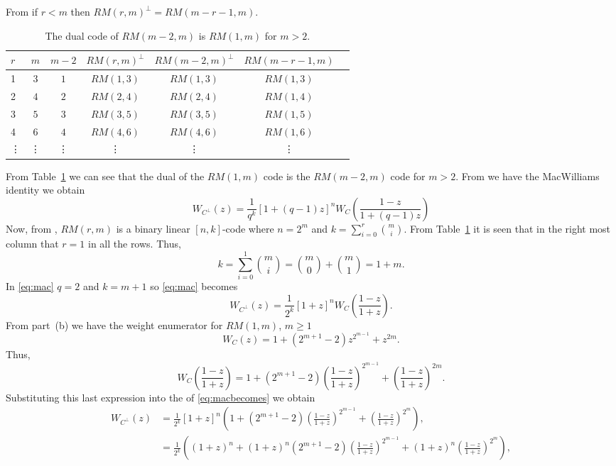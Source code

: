 From  if $r<m$ then $RM(r,m)^\perp = RM(m-r-1,m)$.

\begin{table}[h!]
\centering
\begin{tabular}{@{}lcccc|cl@{}}
\toprule
$r$&$m$ & $m-2$ & $RM(r,m)^\perp$ & $RM(m-2,m)^\perp$ &$RM(m-r-1,m)$ &  \\ \midrule
1 & $3$ & $1$ & $RM(1,3)$ & $RM(1,3)$  &$RM(1,3)$&  \\
2 & $4$ & $2$ & $RM(2,4)$ & $RM(2,4)$  &$RM(1,4)$&  \\ 
3 & $5$ & $3$ & $RM(3,5)$ & $RM(3,5)$  &$RM(1,5)$&  \\ 
4 & $6$ & $4$ & $RM(4,6)$ & $RM(4,6)$  &$RM(1,6)$&  \\ 
\vdots &\vdots& \vdots & \vdots &\vdots &\vdots &  \\ 
 \bottomrule
\end{tabular}
\caption{The dual code of $RM(m-2,m)$ is $RM(1,m)$ for $m>2$.}
\label{tab:rmduals}
\end{table}
From Table~\ref{tab:rmduals} we can see that the dual of the  $RM(1,m)$ code is the $RM(m-2,m)$ code for $m>2$. From  we have the MacWilliams identity we obtain
\begin{equation}
\label{eq:mac}
W_{C^\perp}(z) = \frac{1}{q^{k}}\left[1+(q-1)z\right]^n W_{C}\left(\frac{1-z}{1+(q-1)z}\right)
\end{equation}
Now, from , $RM(r,m)$ is a binary linear $[n,k]$-code where $n=2^m$ and $k=\sum_{i=0}^r\binom{m}{i}$. From Table~\ref{tab:rmduals} it is seen that in the right most column that $r=1$ in all the rows. Thus,
\[
	k = \sum_{i=0}^1\binom{m}{i} = \binom{m}{0} + \binom{m}{1} = 1 + m.
\]
In \ref{eq:mac} $q=2$ and $k=m+1$ so \ref{eq:mac} becomes
\begin{equation}
\label{eq:macbecomes}
W_{C^\perp}(z) = \frac{1}{2^{k}}\left[1+z\right]^n W_{C}\left(\frac{1-z}{1+z}\right).
\end{equation}
From part~(b) we have the weight enumerator for $RM(1,m)$, $m\geq1$ 
\[
	W_C(z) = 1 + (2^{m+1} - 2)z^{2^{m-1}} + z^{2m}.
\]
Thus,
\[
	W_C\left(\frac{1-z}{1+z}\right) = 1 + (2^{m+1} - 2)\left(\frac{1-z}{1+z}\right)^{2^{m-1}} + \left(\frac{1-z}{1+z}\right)^{2m}.
\]
Substituting this last expression into the \rhs of \eqref{eq:macbecomes} we obtain
\begin{align*}
W_{C^\perp}(z) &= \frac{1}{2^{k}}\left[1+z\right]^n \left(1 + (2^{m+1} - 2)\left(\frac{1-z}{1+z}\right)^{2^{m-1}} + \left(\frac{1-z}{1+z}\right)^{2^m}\right),\\
&=\frac{1}{2^{k}} \left(\left(1+z\right)^n + \left(1+z\right)^n(2^{m+1} - 2)\left(\frac{1-z}{1+z}\right)^{2^{m-1}} + \left(1+z\right)^n\left(\frac{1-z}{1+z}\right)^{2^m}\right),\\
\end{align*}

